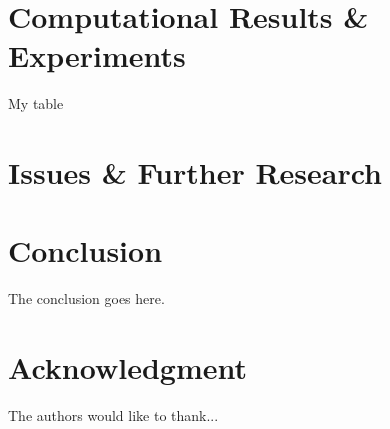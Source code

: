 \documentclass[12pt]{article}
\begin{document}
\section{Computational Results \& Experiments}
\label{sec:experiments}

\begin{table}[H]
\centering

\caption{My table}
\label{table:kysymys}
\end{table}

\section{Issues \& Further Research}
\label{sec:issues}

\section{Conclusion}
\label{sec:conclusion}

The conclusion goes here.

\section*{Acknowledgment}
The authors would like to thank...



\end{document}
